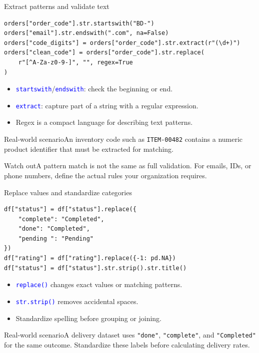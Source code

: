 \documentclass[aspectratio=169,10pt]{beamer}
\newcommand{\scenario}[1]{\begin{block}{Real-world scenario}#1\end{block}}
\newcommand{\pitfall}[1]{\begin{alertblock}{Watch out}#1\end{alertblock}}
\newcommand{\method}[1]{\texttt{\textcolor{Blue}{#1}}}
\begin{document}
\begin{frame}[fragile]{Extract patterns and validate text}
\begin{lstlisting}
orders["order_code"].str.startswith("BD-")
orders["email"].str.endswith(".com", na=False)
orders["code_digits"] = orders["order_code"].str.extract(r"(\d+)")
orders["clean_code"] = orders["order_code"].str.replace(
    r"[^A-Za-z0-9-]", "", regex=True
)
\end{lstlisting}
\begin{itemize}
\item \method{startswith}/\method{endswith}: check the beginning or end.
\item \method{extract}: capture part of a string with a regular expression.
\item Regex is a compact language for describing text patterns.
\end{itemize}
\scenario{An inventory code such as \texttt{ITEM-00482} contains a numeric product identifier that must be extracted for matching.}
\pitfall{A pattern match is not the same as full validation. For emails, IDs, or phone numbers, define the actual rules your organization requires.}
\end{frame}

\begin{frame}[fragile]{Replace values and standardize categories}
\begin{lstlisting}
df["status"] = df["status"].replace({
    "complete": "Completed",
    "done": "Completed",
    "pending ": "Pending"
})
df["rating"] = df["rating"].replace({-1: pd.NA})
df["status"] = df["status"].str.strip().str.title()
\end{lstlisting}
\begin{itemize}
\item \method{replace()} changes exact values or matching patterns.
\item \method{str.strip()} removes accidental spaces.
\item Standardize spelling before grouping or joining.
\end{itemize}
\scenario{A delivery dataset uses \texttt{"done"}, \texttt{"complete"}, and \texttt{"Completed"} for the same outcome. Standardize these labels before calculating delivery rates.}
\end{frame}
\end{document}
